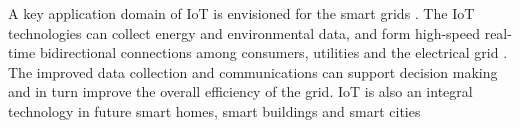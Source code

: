 A key application domain of IoT is envisioned for the smart grids \cite{shin2014socio}. 
%
The IoT technologies can collect energy and environmental data, and form  high-speed real-time bidirectional connections among consumers, utilities and the electrical grid \cite{yun2010research}. The improved data collection and communications can support decision making and in turn improve the overall efficiency of the grid. 
%
 IoT is also an integral technology in future smart homes, smart buildings and smart cities  \cite{schatten2014smart,zanella2014internet,zygiaris2013smart}
